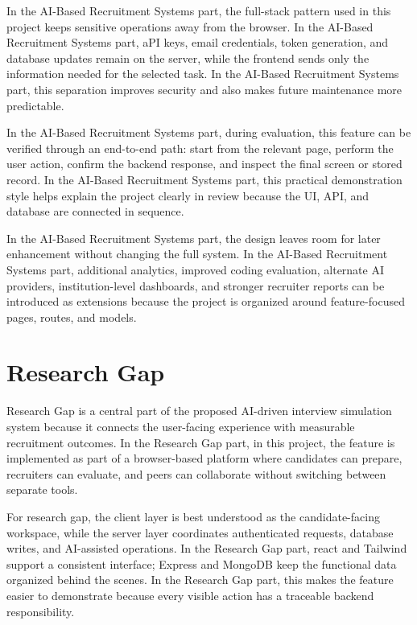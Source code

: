 \documentclass[12pt,a4paper]{report}
\begin{document}
In the AI-Based Recruitment Systems part, the full-stack pattern used in this project keeps sensitive operations away from the browser. In the AI-Based Recruitment Systems part, aPI keys, email credentials, token generation, and database updates remain on the server, while the frontend sends only the information needed for the selected task. In the AI-Based Recruitment Systems part, this separation improves security and also makes future maintenance more predictable.


In the AI-Based Recruitment Systems part, during evaluation, this feature can be verified through an end-to-end path: start from the relevant page, perform the user action, confirm the backend response, and inspect the final screen or stored record. In the AI-Based Recruitment Systems part, this practical demonstration style helps explain the project clearly in review because the UI, API, and database are connected in sequence.


In the AI-Based Recruitment Systems part, the design leaves room for later enhancement without changing the full system. In the AI-Based Recruitment Systems part, additional analytics, improved coding evaluation, alternate AI providers, institution-level dashboards, and stronger recruiter reports can be introduced as extensions because the project is organized around feature-focused pages, routes, and models.


\section{Research Gap}

Research Gap is a central part of the proposed AI-driven interview simulation system because it connects the user-facing experience with measurable recruitment outcomes. In the Research Gap part, in this project, the feature is implemented as part of a browser-based platform where candidates can prepare, recruiters can evaluate, and peers can collaborate without switching between separate tools.


For research gap, the client layer is best understood as the candidate-facing workspace, while the server layer coordinates authenticated requests, database writes, and AI-assisted operations. In the Research Gap part, react and Tailwind support a consistent interface; Express and MongoDB keep the functional data organized behind the scenes. In the Research Gap part, this makes the feature easier to demonstrate because every visible action has a traceable backend responsibility.
\end{document}

